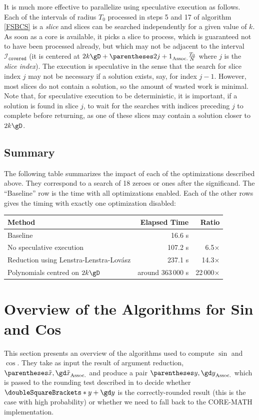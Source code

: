 \documentclass[10pt, a4paper, twoside]{basestyle}
\newcommand{\round}[1]{\doubleSquareBrackets*{#1}}
\newcommand{\red}[1]{\tilde{#1}}
\begin{document}
It is much more effective to parallelize using speculative execution as follows.  Each of the intervals of radius $T_0$ processed in steps 5 and 17 of algorithm \ref{FSBCS} is a \emph{slice} and slices can be searched independently for a given value of $k$.  As soon as a core is available, it picks a slice to process, which is guaranteed not to have been processed already, but which may not be adjacent to the interval $\mathscr{I}_{\texttt{covered}}$ (it is centered at $2 k \gD + \pa{2 j + 1} \frac{T_0}{N}$ where $j$ is the \emph{slice index}).  The execution is speculative in the sense that the search for slice index $j$ may not be necessary if a solution exists, say, for index $j - 1$.  However, most slices do not contain a solution, so the amount of wasted work is minimal.  Note that, for speculative execution to be deterministic, it is important, if a solution is found in slice $j$, to wait for the searches with indices preceding $j$ to complete before returning, as one of these slices may contain a solution closer to $2 k \gD$.

\subsection*{Summary}

The following table summarizes the impact of each of the optimizations described above.  They correspond to a search of 18 zeroes or ones after the significand.  The ``Baseline'' row is the time with all optimizations enabled.  Each of the other rows gives the timing with exactly one optimization disabled:
\begin{center}
\begin{tabular}{lrr}
Method & Elapsed Time & Ratio \\
\hline
Baseline & 16.6 s &  \\
No speculative execution & 107.2 s & 6.5× \\
Reduction using Lenstra-Lenstra-Lovász & 237.1 s & 14.3× \\
Polynomials centred on $2 k \gD$ & around 363\,000 s & 22\,000×
\end{tabular}
\end{center}

\section*{Overview of the Algorithms for Sin and Cos}\label{overview}

This section presents an overview of the algorithms used to compute $\sin$ and $\cos$.  They take as input the result of argument reduction, $\pa{\red x, \gd \red x}$ and produce a pair $\pa{y, \gd y}$ which is passed to the rounding test described in \cite[397]{MullerBrisebarreDeDinechinJeannerodLefevreMelquiondRevolStehleTorres2010} to decide whether $\round{y + \gd y}$ is the correctly-rounded result (this is the case with high probability) or whether we need to fall back to the CORE-MATH implementation.
\end{document}
